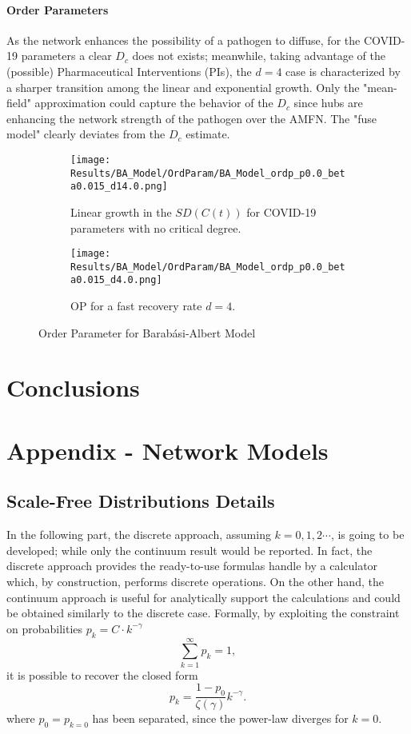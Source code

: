 \documentclass[a4paper,10pt,twoside]{book} %
\theoremstyle{definition}
\begin{document}
\clearpage
\subsubsection*{Order Parameters}
As the network enhances the possibility of a pathogen to diffuse, for the COVID-19 parameters a clear $D_c$ does not exists; meanwhile, taking advantage of the (possible) Pharmaceutical Interventions (PIs), the $d = 4$ case is characterized by a sharper transition among the linear and exponential growth. Only the "mean-field" approximation could capture the behavior of the $ D_c$ since hubs are enhancing the network strength of the pathogen over the AMFN. The "fuse model" clearly deviates from the $ D_c$ estimate. 
\begin{figure}[t]
	\begin{subfigure}[t]{0.48\linewidth}
		\centering
		\texttt{[image: Results/BA\_Model/OrdParam/BA\_Model\_ordp\_p0.0\_beta0.015\_d14.0.png]}
		\caption{Linear growth in the $SD(C(t))$ for COVID-19 parameters with no critical degree.}
		\label{fig:Ordp_BA_d14}
	\end{subfigure}
	\hfill
	\begin{subfigure}[t]{0.48\linewidth}
		\centering
		\texttt{[image: Results/BA\_Model/OrdParam/BA\_Model\_ordp\_p0.0\_beta0.015\_d4.0.png]}
		\caption{OP for a fast recovery rate $ d = 4$.}
		\label{fig:Ordp_BA_COVID_d1}
	\end{subfigure}
	\caption{Order Parameter for Barabási-Albert Model}
	\label{fig:Ordp_BA_COVID}
\end{figure}


\chapter{Conclusions}


\appendix
\chapter{Appendix - Network Models}

\section{Scale-Free Distributions Details}
\label{sec:SFD_details}
In the following part, the discrete approach, assuming $k = 0,1,2\cdots$, is going to be developed; while only the continuum result would be reported. In fact, the discrete approach provides the ready-to-use formulas handle by a calculator which, by construction, performs discrete operations. On the other hand, the continuum approach is useful for analytically support the calculations and could be obtained similarly to the discrete case.
Formally, by exploiting the constraint on probabilities $p_k = C\cdot k^{-\gamma}$ \[\sum_{k=1}^{\infty} p_k = 1,\] it is possible to recover the closed form \cite{barabasi::2016networkbook}
\begin{equation}
	p_k = \frac{1-p_0}{\zeta(\gamma)}k^{-\gamma}.
	\label{eq:p_scalefree}
\end{equation}
where $p_0 = p_{k=0}$ has been separated, since the power-law diverges for $k=0$.
\end{document}
